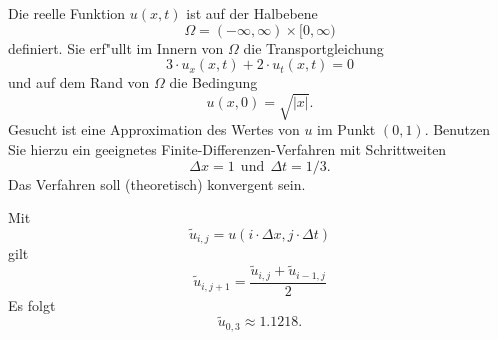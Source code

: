 Die reelle Funktion $u(x,t)$ ist auf der Halbebene 
\[
\Omega = (-\infty, \infty) \times [0,\infty)
\]
definiert. Sie erf"ullt im Innern von $\Omega$ die Transportgleichung
\[
3 \cdot u_{x}(x,t) + 2 \cdot u_{t}(x,t) = 0
\]
und auf dem Rand von $\Omega$ die Bedingung 
\[
u(x,0) = \sqrt{|x|}.
\]
Gesucht ist eine Approximation des Wertes von $u$ im Punkt $(0,1)$.
Benutzen Sie hierzu ein geeignetes Finite-Differenzen-Verfahren
mit Schrittweiten
\[
\Delta x = 1 \ \ \mbox{und} \ \  \Delta t = 1/3.
\]
Das Verfahren soll (theoretisch) konvergent sein.

\begin{loesung}
Mit  
\[
\tilde u_{i,j} = u(i \cdot \Delta x, j \cdot \Delta t)
\]
gilt 
\[
\tilde u_{i,j+1} = \frac{\tilde u_{i,j} + \tilde u_{i-1,j}}{2}
\]
Es folgt 
\[
\tilde u_{0,3} \approx 1.1218.
\]
\end{loesung}
